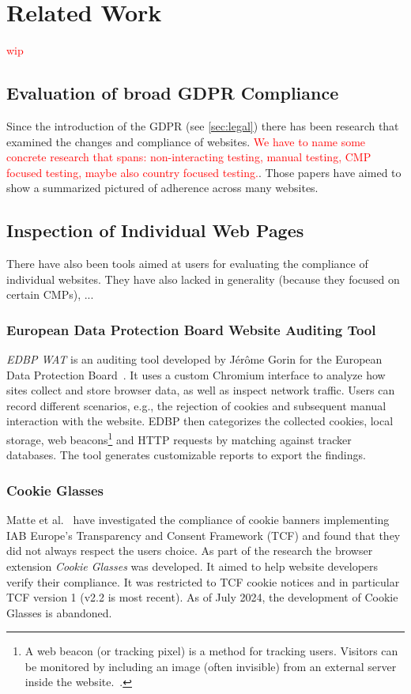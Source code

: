 \chapter{Related Work}

\textcolor{red}{wip}

\section{Evaluation of broad GDPR Compliance}
Since the introduction of the GDPR (see \cref{sec:legal}) there has been research that examined the changes and compliance of websites.
\textcolor{red}{We have to name some concrete research that spans: non-interacting testing, manual testing, CMP focused testing, maybe also country focused testing.}. 
Those papers have aimed to show a summarized pictured of adherence across many websites.

\section{Inspection of Individual Web Pages}
There have also been tools aimed at users for evaluating the compliance of individual websites. 
They have also lacked in generality (because they focused on certain CMPs), ...

\subsection{European Data Protection Board Website Auditing Tool}
\emph{EDBP WAT} is an auditing tool developed by Jérôme Gorin for the European Data Protection Board~\cite{gorin2024edpb}.
It uses a custom Chromium interface to analyze how sites collect and store browser data, as well as inspect network traffic. 
Users can record different scenarios, e.g., the rejection of cookies and subsequent manual interaction with the website.
EDBP then categorizes the collected cookies, local storage, web beacons\footnote{
A web beacon (or tracking pixel) is a method for tracking users. 
Visitors can be monitored by including an image (often invisible) from an external server inside the website.~\cite{smith1999web}.
} and HTTP requests by matching against tracker databases.
The tool generates customizable reports to export the findings.

\subsection{Cookie Glasses}
Matte et al.~\cite{matte2020cookiebannersrespectchoice} have investigated the compliance of cookie banners implementing IAB Europe’s Transparency and Consent Framework (TCF) and found that they did not always respect the users choice.
As part of the research the browser extension \emph{Cookie Glasses} was developed.
It aimed to help website developers verify their compliance.
It was restricted to TCF cookie notices and in particular TCF version 1 (v2.2 is most recent).
As of July 2024, the development of Cookie Glasses is abandoned.

